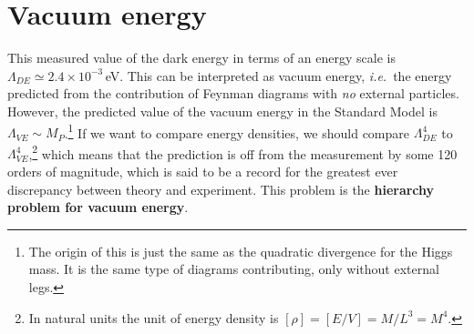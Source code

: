 \documentclass[notes.tex]{subfiles}
\begin{document}
%
%



\section{Vacuum energy}
\label{sec:vacuum_energy}
This measured value of the dark energy in terms of an energy scale is $\Lambda_{DE} \simeq 2.4\times 10^{-3}$\,eV. This can be interpreted as vacuum energy, {\it i.e.}\ the energy predicted from the contribution of Feynman diagrams with {\it no} external particles. However, the predicted value of the vacuum energy in the Standard Model is $\Lambda_{VE} \sim M_P$.\footnote{The origin of this is just the same as the quadratic divergence for the Higgs mass. It is the same type of diagrams contributing, only without external legs.} If we want to compare energy densities, we should compare $\Lambda_{DE}^4$ to $\Lambda_{VE}^4$,\footnote{In natural units the unit of energy density is $[\rho]=[E/V]=M/L^3=M^4$.} which means that the prediction is off from the measurement by some 120 orders of magnitude, which is said to be a record for the greatest ever discrepancy between theory and experiment. This problem is the {\bf hierarchy problem for vacuum energy}.
\end{document}
